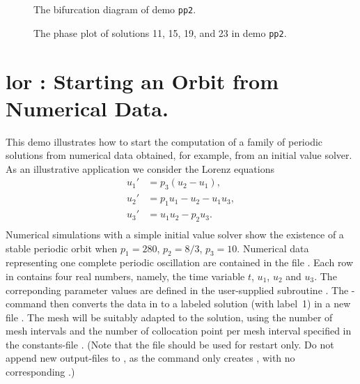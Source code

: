 \documentclass[12pt]{report}
\begin{document}
\begin{figure}[p]
\epsfysize 9.0cm
\centerline{}
\caption{The bifurcation diagram of demo {\tt pp2}.}
\label{fig:pp2_1}
\end{figure}

\begin{figure}[p]
\epsfysize 9.0cm
\centerline{}
\caption{The phase plot of solutions 11, 15, 19, and 23 in demo {\tt pp2}.}
\label{fig:pp2_2}
\end{figure}


\newpage
\section{ lor : Starting an Orbit from Numerical Data.} \label{sec:Demos_lor}
This demo illustrates how to start the computation of a family of
periodic solutions from numerical data obtained, for example, from an
initial value solver.
As an illustrative application we consider the Lorenz equations
\begin{equation} \begin{array}{cl}
  u_1' &=  p_3 (u_2 - u_1), \\
  u_2' &=  p_1 u_1 - u_2 - u_1 u_3,  \\
  u_3' &=  u_1 u_2 - p_2 u_3. \\\end{array} \end{equation}
Numerical simulations with a simple initial value solver show the
existence of a stable periodic orbit when $p_1=280$, $p_2=8/3$, $p_3=10$.
Numerical data representing one complete periodic oscillation are
contained in the file . 
Each row in  contains four real numbers, namely,
the time variable $t$, $u_1$, $u_2$ and $u_3$.
The correponding parameter values are defined in the user-supplied subroutine
.
The \AUTO-command  then converts the data in 
to a labeled
\AUTO solution (with label~1) in a new file .
The mesh will be suitably adapted to the solution, using the number of
mesh intervals  and the number of collocation point per mesh
interval  specified in the constants-file .
(Note that the file  should be used for restart only.
Do not append new output-files to , as the command 
only creates , with no corresponding .)
\end{document}
